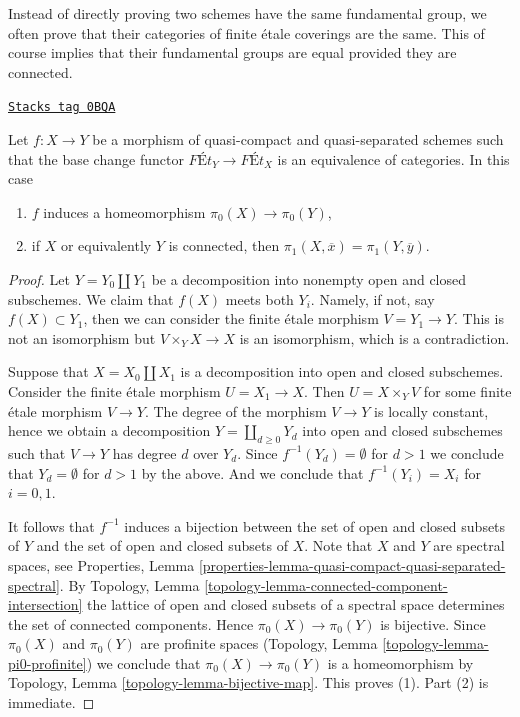 \medskip\noindent
Instead of directly proving two schemes have the same fundamental
group, we often prove that their categories of finite \'etale
coverings are the same. This of course implies that
their fundamental groups are equal provided they are connected.

\begin{lemma}
\label{pione-lemma-what-equivalence-gives}
\href{https://stacks.math.columbia.edu/tag/0BQA}{\texttt{Stacks tag 0BQA}}

Let $f : X \to Y$ be a morphism of quasi-compact and quasi-separated schemes
such that the base change functor $\textit{F\'Et}_Y \to \textit{F\'Et}_X$
is an equivalence of categories. In this case
\begin{enumerate}
\item $f$ induces a homeomorphism $\pi_0(X) \to \pi_0(Y)$,
\item if $X$ or equivalently $Y$ is connected, then
$\pi_1(X, \overline{x}) = \pi_1(Y, \overline{y})$.
\end{enumerate}
\end{lemma}

\begin{proof}
Let $Y = Y_0 \amalg Y_1$ be a decomposition into nonempty open and closed
subschemes. We claim that $f(X)$ meets both $Y_i$. Namely, if not,
say $f(X) \subset Y_1$, then we can consider the finite \'etale
morphism $V = Y_1 \to Y$. This is not an
isomorphism but $V \times_Y X \to X$ is an isomorphism, which is
a contradiction.

\medskip\noindent
Suppose that $X = X_0 \amalg X_1$ is a decomposition into open and closed
subschemes. Consider the finite \'etale morphism $U = X_1 \to X$. Then
$U = X \times_Y V$ for some finite \'etale morphism $V \to Y$. The degree
of the morphism $V \to Y$ is locally constant, hence we obtain a decomposition
$Y = \coprod_{d \geq 0} Y_d$ into open and closed subschemes
such that $V \to Y$ has degree $d$ over $Y_d$. Since
$f^{-1}(Y_d) = \emptyset$ for $d > 1$ we conclude that $Y_d = \emptyset$
for $d > 1$ by the above. And we conclude that $f^{-1}(Y_i) = X_i$
for $i = 0, 1$.

\medskip\noindent
It follows that $f^{-1}$ induces a bijection between the set of
open and closed subsets of $Y$ and the set of open and closed subsets of $X$.
Note that $X$ and $Y$ are spectral spaces, see Properties, Lemma
\ref{properties-lemma-quasi-compact-quasi-separated-spectral}.
By Topology, Lemma \ref{topology-lemma-connected-component-intersection}
the lattice of open and closed subsets of a spectral space
determines the set of connected components.
Hence $\pi_0(X) \to \pi_0(Y)$ is bijective. Since $\pi_0(X)$ and
$\pi_0(Y)$ are profinite spaces
(Topology, Lemma \ref{topology-lemma-pi0-profinite})
we conclude that $\pi_0(X) \to \pi_0(Y)$ is a homeomorphism by
Topology, Lemma \ref{topology-lemma-bijective-map}. This proves (1).
Part (2) is immediate.
\end{proof}

